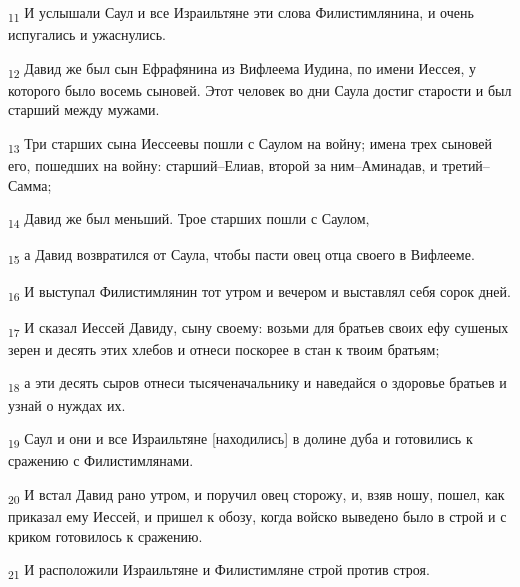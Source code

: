 \begin{tcolorbox}
\textsubscript{11} И услышали Саул и все Израильтяне эти слова Филистимлянина, и очень испугались и ужаснулись.
\end{tcolorbox}
\begin{tcolorbox}
\textsubscript{12} Давид же был сын Ефрафянина из Вифлеема Иудина, по имени Иессея, у которого было восемь сыновей. Этот человек во дни Саула достиг старости и был старший между мужами.
\end{tcolorbox}
\begin{tcolorbox}
\textsubscript{13} Три старших сына Иессеевы пошли с Саулом на войну; имена трех сыновей его, пошедших на войну: старший--Елиав, второй за ним--Аминадав, и третий--Самма;
\end{tcolorbox}
\begin{tcolorbox}
\textsubscript{14} Давид же был меньший. Трое старших пошли с Саулом,
\end{tcolorbox}
\begin{tcolorbox}
\textsubscript{15} а Давид возвратился от Саула, чтобы пасти овец отца своего в Вифлееме.
\end{tcolorbox}
\begin{tcolorbox}
\textsubscript{16} И выступал Филистимлянин тот утром и вечером и выставлял себя сорок дней.
\end{tcolorbox}
\begin{tcolorbox}
\textsubscript{17} И сказал Иессей Давиду, сыну своему: возьми для братьев своих ефу сушеных зерен и десять этих хлебов и отнеси поскорее в стан к твоим братьям;
\end{tcolorbox}
\begin{tcolorbox}
\textsubscript{18} а эти десять сыров отнеси тысяченачальнику и наведайся о здоровье братьев и узнай о нуждах их.
\end{tcolorbox}
\begin{tcolorbox}
\textsubscript{19} Саул и они и все Израильтяне [находились] в долине дуба и готовились к сражению с Филистимлянами.
\end{tcolorbox}
\begin{tcolorbox}
\textsubscript{20} И встал Давид рано утром, и поручил овец сторожу, и, взяв ношу, пошел, как приказал ему Иессей, и пришел к обозу, когда войско выведено было в строй и с криком готовилось к сражению.
\end{tcolorbox}
\begin{tcolorbox}
\textsubscript{21} И расположили Израильтяне и Филистимляне строй против строя.
\end{tcolorbox}
